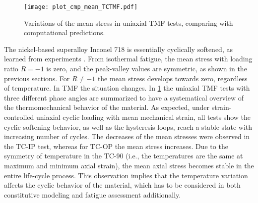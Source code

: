 \begin{figure}[!ht]
  \centering
  \texttt{[image: plot\_cmp\_mean\_TCTMF.pdf]}
  \caption{Variations of the mean stress in uniaxial TMF tests, comparing with computational predictions.}
  \label{Fig:plot_cmp_mean_TCTMF}
\end{figure}

The nickel-based superalloy Inconel 718 is essentially cyclically softened, as learned from experiments \cite{Koch85,Morrow88,Socie2000}. From isothermal fatigue, the mean stress with loading ratio $R=-1$ is zero, and the peak-valley values are symmetric, as shown in the previous sections. For $R \ne -1$ the mean stress develops towards zero, regardless of temperature. In TMF the situation changes. In \ref{Fig:plot_cmp_mean_TCTMF} the uniaxial TMF tests with three different phase angles are summarized to have a systematical overview of the thermomechanical behavior of the material. As expected, under strain-controlled uniaxial cyclic loading with mean mechanical strain, all tests show the cyclic softening behavior, as well as the hysteresis loops, reach a stable state with increasing number of cycles. The decreases of the mean stresses were observed in the TC-IP test, whereas for TC-OP the mean stress increases. Due to the symmetry of temperature in the TC-90 (i.e., the temperatures are the same at maximum and minimum axial strain), the mean axial stress becomes stable in the entire life-cycle process. This observation implies that the temperature variation affects the cyclic behavior of the material, which has to be considered in both constitutive modeling and fatigue assessment additionally.



